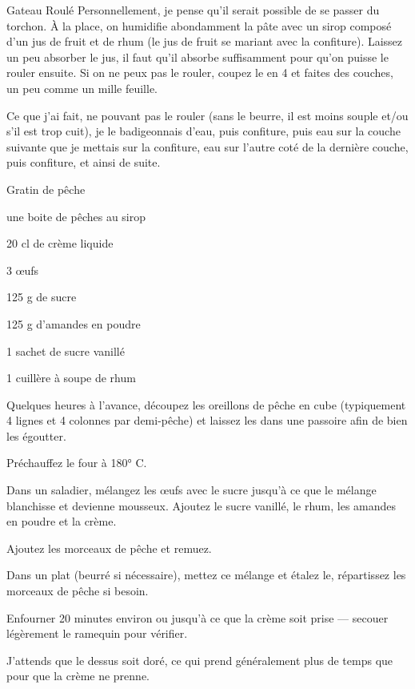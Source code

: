 \begin{recette}{Gateau Roulé}
Personnellement, je pense qu'il serait possible de se passer du torchon. À la place, on humidifie abondamment la pâte avec un sirop composé d'un jus de fruit et de rhum (le jus de fruit se mariant avec la confiture). Laissez un peu absorber le jus, il faut qu'il absorbe suffisamment pour qu'on puisse le rouler ensuite. Si on ne peux pas le rouler, coupez le en 4 et faites des couches, un peu comme un mille feuille.

Ce que j'ai fait, ne pouvant pas le rouler (sans le beurre, il est moins souple et/ou s'il est trop cuit), je le badigeonnais d'eau, puis confiture, puis eau sur la couche suivante que je mettais sur la confiture, eau sur l'autre coté de la dernière couche, puis confiture, et ainsi de suite.

\end{recette}

\begin{recette}{Gratin de pêche}
\begin{ingredients}
\item une boite de pêches au sirop
\item 20 cl de crème liquide
\item 3 œufs 
\item 125 g de sucre 
\item 125 g d'amandes en poudre 
\item 1 sachet de sucre vanillé
\item 1 cuillère à soupe de rhum
\end{ingredients}

\begin{preparation}
\item Quelques heures à l'avance, découpez les oreillons de pêche en cube (typiquement 4 lignes et 4 colonnes par demi-pêche) et laissez les dans une passoire afin de bien les égoutter.

\item Préchauffez le four à 180° C.
\item Dans un saladier, mélangez les œufs avec le sucre jusqu'à ce que le mélange blanchisse et devienne mousseux. Ajoutez le sucre vanillé, le rhum, les amandes en poudre et la crème. 
\item Ajoutez les morceaux de pêche et remuez.
\item Dans un plat (beurré si nécessaire), mettez ce mélange et étalez le, répartissez les morceaux de pêche si besoin.
\end{preparation}

\begin{cuisson}
Enfourner 20 minutes environ ou jusqu'à ce que la crème soit prise --- secouer légèrement le ramequin pour vérifier.

\begin{remarque}
J'attends que le dessus soit doré, ce qui prend généralement plus de temps que pour que la crème ne prenne.
\end{remarque}
\end{cuisson}

\end{recette}

